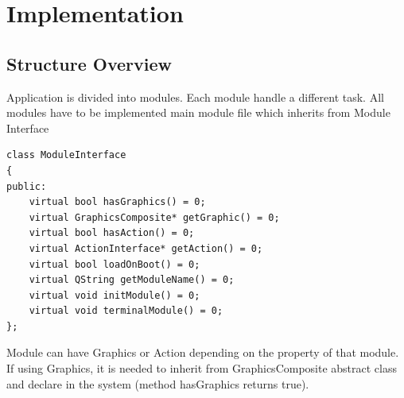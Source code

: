 \documentclass[11pt]{article}
\begin{document}
\begin{figure}[H] 
  \label{fig:gantt2}
\end{figure} 

\section{Implementation}
\subsection{Structure Overview} 
Application is divided into modules. Each module handle a different task.
All modules have to be implemented main module file which inherits from Module Interface

\begin{lstlisting}
class ModuleInterface
{
public:
    virtual bool hasGraphics() = 0;
    virtual GraphicsComposite* getGraphic() = 0;
    virtual bool hasAction() = 0;
    virtual ActionInterface* getAction() = 0;
    virtual bool loadOnBoot() = 0;
    virtual QString getModuleName() = 0;
    virtual void initModule() = 0;
    virtual void terminalModule() = 0;
};
\end{lstlisting}

Module can have Graphics or Action depending on the property of that module. If using Graphics, it is needed to inherit from GraphicsComposite abstract class and declare in the system (method hasGraphics returns true). 
\end{document}
